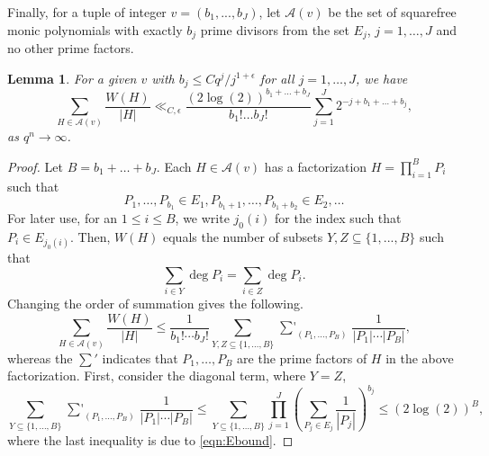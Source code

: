 \documentclass[12pt]{amsart}
\numberwithin{equation}{section}
\newtheorem{lemma}[theorem]{Lemma}
\theoremstyle{definition}
\theoremstyle{remark}
\begin{document}
Finally, for a tuple of integer $v = (b_1,...,b_J)$, let $\mathcal{A}(v)$ be the set of squarefree monic polynomials with exactly $b_j$ prime divisors from the set $E_j$, $j=1,\ldots, J$ and no other prime factors.
\begin{lemma}\label{lm:W(A)}
For a given $v$ with $b_j\leq Cq^j/j^{1+\epsilon}$ for all $j=1,\ldots, J$,  we have
\[
    \sum_{H\in \mathcal{A}(v)} \frac{W(H)}{|H|} \ll_{C,\epsilon} \frac{(2\log(2))^{b_1+\dots+b_J}}{b_1!\dots b_J!} \sum_{j=1}^{J} 2^{-j+b_1+\dots+b_j},
\]
as $q^n\to \infty$.
\end{lemma}
\begin{proof}
    Let $B = b_1+ \dots + b_J$. Each $H \in \mathcal{A}(v)$ has a factorization $H = \prod_{i=1} ^ {B} P_i$ such that
    \begin{equation}\label{eqn:intervals}
        P_1, \dots , P_{b_1} \in E_1, P_{b_1 + 1}, \dots , P_{b_1+b_2} \in E_2, \ldots
    \end{equation}
    For later use, for an $1\leq i\leq B$, we write $j_0(i)$ for the index such that $P_i\in E_{j_0(i)}$.
    Then, $W(H)$ equals the number of subsets $Y,Z \subseteq \{1,...,B\}$ such that
    \begin{equation}\label{eqn:simdiv}
        \sum_{i\in Y} \deg P_i = \sum_{i \in Z} \deg P_i.
    \end{equation}
    Changing the order of summation gives the following.
    \begin{equation}\label{eqn:upperbound}
        \sum_{H \in \mathcal{A}(v)} \frac{W(H)}{|H|} \leq \frac{1}{b_1! \dotsb b_J!} \sum_{Y,Z \subseteq \{1, \dotsc ,B\}} \mathop{{\sum}'}_{(P_1,\dotsc,P_B)}\frac{1}{|P_1| \dotsb |P_B|},
    \end{equation}
    whereas the ${\sum}'$ indicates that $P_1,\ldots, P_B$  are the prime factors of $H$ in the above factorization.
    First, consider the diagonal term, where $Y=Z$,
    \begin{equation}
        \sum_{Y \subseteq \{1, \dotsc ,B\}} \mathop{{\sum}'}_{(P_1,\dotsc,P_B)}\frac{1}{|P_1| \dotsb |P_B|} \leq \sum_{Y \subseteq \{1,\dotsc ,B\}} \prod_{j=1}^{J} \left( \sum_{P_j \in E_j} \frac{1}{|P_j|} \right)^{b_j} \leq (2 \log (2))^B,
    \end{equation}
    where the last inequality is due to \eqref{eqn:Ebound}.
    

\end{proof}
\end{document}
